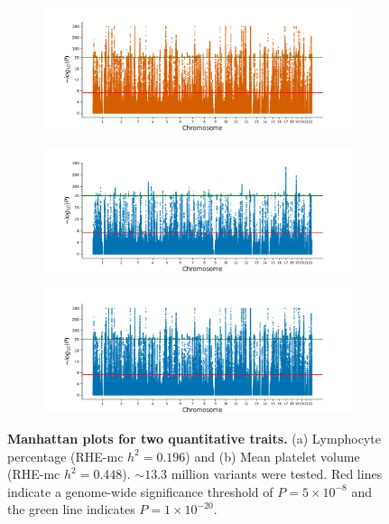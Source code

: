 \begin{figure}[h!]
\begin{subfigure}{.5\textwidth}
    \includegraphics[width=\textwidth]{figures/manhattan_quant/regenie_400k_Mean_platelet_thrombocyte_volume.regenie.png}
    \end{subfigure}
    \begin{subfigure}{.5\textwidth}
    \includegraphics[width=\textwidth]{figures/manhattan_quant/qd_Lymphocyte_percentage.sumstats.gz.png}
    \caption{}
    \end{subfigure}%
    \begin{subfigure}{.5\textwidth}
    \includegraphics[width=\textwidth]{figures/manhattan_quant/qd_Mean_platelet_thrombocyte_volume.sumstats.gz.png}
    \caption{}
    \end{subfigure}
    \caption{\textbf{Manhattan plots for two quantitative traits.}
    (a) Lymphocyte percentage (RHE-mc $h^2 = 0.196$) and (b) Mean platelet volume (RHE-mc $h^2 = 0.448$).
    ${\sim}13.3$ million variants were tested.
    Red lines indicate a genome-wide significance threshold of $ P = 5 \times 10^{-8}$ and the green line indicates $P = 1 \times 10^{-20}$.
    }
    \label{fig:qd_man_quant2}
\end{figure}



